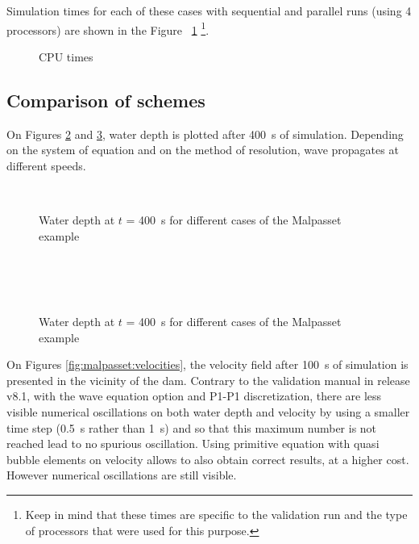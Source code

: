 Simulation times for each of these cases with sequential and parallel runs
(using 4 processors) are shown in the Figure ~\ref{fig:malpasset:cputime}
\footnote{Keep in mind that these times
are specific to the validation run and the type of processors that were used for this purpose.}.

\begin{figure}[h!]
  \centering
  \caption{CPU times}\label{fig:malpasset:cputime}
\end{figure}

\subsection{Comparison of schemes}

On Figures \ref{fig:malpasset:WD_all1} and \ref{fig:malpasset:WD_all2},
water depth is plotted after 400~s of simulation.
Depending on the system of equation and on the method of resolution, wave
propagates at different speeds.

\begin{figure}[H]
  \centering
  \\
  \caption{Water depth at $t$ = 400~s for different cases of the Malpasset example}\label{fig:malpasset:WD_all1}
\end{figure}

\begin{figure}[H]
  \centering
  \\
  \\
  \\
  \caption{Water depth at $t$ = 400~s for different cases of the Malpasset example}\label{fig:malpasset:WD_all2}
\end{figure}

On Figures \ref{fig:malpasset:velocities}, the velocity field after 100~s of
simulation is presented in the vicinity of the dam.
Contrary to the  validation manual in release v8.1,
with the wave equation option and P1-P1 discretization, there are less visible
numerical oscillations on both water depth and velocity by
using a smaller time step (0.5~s rather than 1~s) and
 so that this maximum
number is not reached lead to no spurious oscillation.
Using primitive equation with quasi bubble elements on velocity allows to also
obtain correct results, at a higher cost.
However numerical oscillations are still visible.

